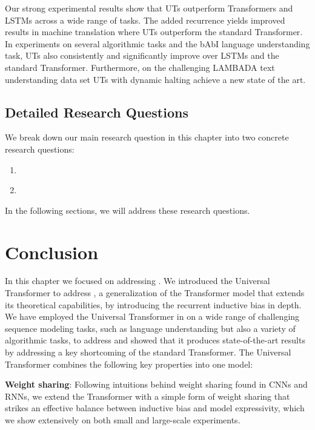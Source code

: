Our strong experimental results show that UTs outperform Transformers and LSTMs across a wide range of tasks. The added recurrence yields improved results in machine translation where UTs outperform the standard Transformer. In experiments on several algorithmic tasks and the bAbI language understanding task, UTs also consistently and significantly improve over LSTMs and the standard Transformer. Furthermore, on the challenging LAMBADA text understanding data set UTs with dynamic halting achieve a new state of the art.

\subsection{Detailed Research Questions}
We break down our main research question in this chapter into two concrete research questions:
\begin{resqbox}
\begin{enumerate}
\item[\textbf{\resqname{c6.1}}] \emph{}
\item[\textbf{\resqname{c6.2}}] \emph{}
\end{enumerate}
\end{resqbox}

In the following sections, we will address these research questions.




\section{Conclusion}
In this chapter we focused on addressing \textbf{}.
We introduced the Universal Transformer to address \textbf{}, a generalization of the Transformer model that extends its theoretical capabilities, by introducing the recurrent inductive bias in depth. 
We have employed the Universal Transformer in on a wide range of challenging sequence modeling tasks, such as language understanding but also a variety of algorithmic tasks, to address \textbf{} and showed that it produces state-of-the-art results by addressing a key shortcoming of the standard Transformer. The Universal Transformer combines the following key properties into one model:

\textbf{Weight sharing}: Following intuitions behind weight sharing found in CNNs and RNNs, we extend the Transformer with a simple form of weight sharing that strikes an effective balance between inductive bias and model expressivity, which we show extensively on both small and large-scale experiments.

